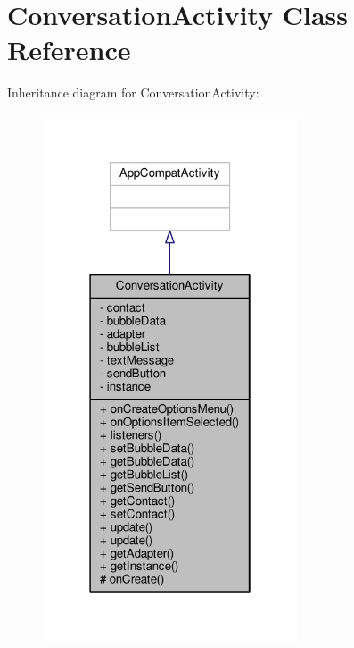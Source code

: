 \hypertarget{a00006}{\section{Conversation\+Activity Class Reference}
\label{a00006}
}


Inheritance diagram for Conversation\+Activity\+:
\nopagebreak
\begin{figure}[H]
\begin{center}
\leavevmode
\includegraphics[width=214pt]{a00078}
\end{center}
\end{figure}


